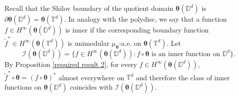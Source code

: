 \documentclass[12pt,reqno]{amsart}
\theoremstyle{remark}
\theoremstyle{definition}
\begin{document}
Recall that the Shilov boundary of the quotient domain $\boldsymbol\theta(\mathbb D^d)$ is $\partial\boldsymbol \theta(\mathbb D^d)=\boldsymbol \theta(\mathbb T^d).$ In analogy with the polydisc, we say that a function $f\in H^\infty(\boldsymbol \theta(\mathbb D^d))$ is inner if the corresponding boundary function $\tilde{f}^*\in H^\infty(\boldsymbol  \theta(\mathbb T^d))$ is unimodular $\mu_{\boldsymbol \theta}$-a.e. on $\boldsymbol \theta(\mathbb T^d).$ 
Let $$\mathcal{I}(\boldsymbol \theta(\mathbb D^d))=\{f\in H^\infty(\boldsymbol \theta(\mathbb D^d)): f\circ\boldsymbol \theta \text{ is an inner function on } \mathbb D^d\}.$$ 
By Proposition \ref{required result 2}, for every $f\in H^\infty(\boldsymbol \theta(\mathbb D^d))$, $\tilde{f}^* \circ \boldsymbol \theta=(f \circ \boldsymbol \theta)^*$ almost everywhere on $\mathbb T^d$ and therefore the class of inner functions on $\boldsymbol \theta(\mathbb D^d)$ coincides with $\mathcal{I}(\boldsymbol \theta(\mathbb D^d)).$
\end{document}
